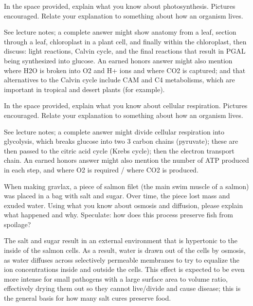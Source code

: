 \documentclass[exam,addpoints,noanswers]{exam}
\begin{document}
\begin{questions}
\clearpage
\question[23] In the space provided, explain what you know about photosynthesis. Pictures encouraged. Relate your explanation to something about how an organism lives.
\begin{solution}[6in]
See lecture notes; a complete answer might show anatomy from a leaf, section through a leaf, chloroplast in a plant cell, and finally within the chloroplast, then discuss: light reactions, Calvin cycle, and the final reactions that result in PGAL being synthesized into glucose. An earned honors answer might also mention where H2O is broken into O2 and H+ ions and where CO2 is captured; and that alternatives to the Calvin cycle include CAM and C4 metabolisms, which are important in tropical and desert plants (for example). 
\end{solution}

\clearpage
\question[23] In the space provided, explain what you know about cellular respiration. Pictures encouraged. Relate your explanation to something about how an organism lives. 
\begin{solution}[6in]
See lecture notes; a complete answer might divide cellular respiration into glycolysis, which breaks glucose into two 3 carbon chains (pyruvate); these are then passed to the citric acid cycle (Krebs cycle); then the electron transport chain. An earned honors answer might also mention the number of ATP produced in each step, and where O2 is required / where CO2 is produced. 
\end{solution}

\clearpage
\question[22] When making gravlax, a piece of salmon filet (the main swim muscle of a salmon) was placed in a bag with salt and sugar. Over time, the piece lost mass and exuded water. Using what you know about osmosis and diffusion, please explain what happened and why. Speculate: how does this process preserve fish from spoilage? 
\begin{solution}[6in]
The salt and sugar result in an external environment that is hypertonic to the inside of the salmon cells. As a result, water is drawn out of the cells by osmosis, as water diffuses across selectively permeable membranes to try to equalize the ion concentrations inside and outside the cells. This effect is expected to be even more intense for small pathogens with a large surface area to volume ratio, effectively drying them out so they cannot live/divide and cause disease; this is the general basis for how many salt cures preserve food. 
\end{solution}


\end{questions}
\end{document}
